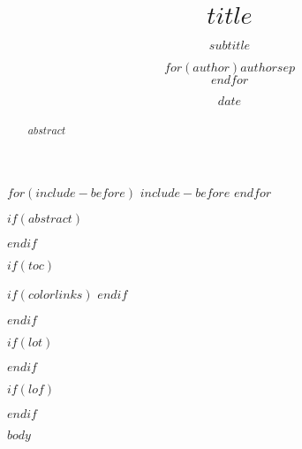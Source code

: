 \documentclass[doctor,twoside,chapterhead,otf]{znufethesis}
\title{$title$}
\title{}
\subtitle{$subtitle$}
\author{$for(author)$$author$$sep$ \\ $endfor$}
\author{}
\date{$date$}
\date{}
\begin{document}

\blankpage

$for(include-before)$
$include-before$
$endfor$

\cleardoublepage
{} %

\blankpage

\cleardoublepage
\frontmatter
\pagestyle{plain}

\cleardoublepage
{} %
\ifodd\thepage
\blankpage
\fi

\cleardoublepage
\frontmatter

\ifodd\therealpage
\blankpage
\fi

$if(abstract)$
\begin{abstract}
$abstract$
\end{abstract}
$endif$

$if(toc)$
{
$if(colorlinks)$
\hypersetup{linkcolor=$if(toccolor)$$toccolor$$else$black$endif$}
$endif$

\setcounter{tocdepth}{$toc-depth$}
\cleardoublepage
{} %
\tableofcontents        %

\ifodd\thepage
\blankpage
\fi
}
$endif$

$if(lot)$
\cleardoublepage
{} %
\listoftables           %

\ifodd\thepage
\blankpage
\fi
$endif$

$if(lof)$
\cleardoublepage
{} %
\listoffigures          %

\ifodd\thepage
\blankpage
\fi
$endif$

\mainmatter
\pagestyle{mpage}

$body$

\ifodd\thepage
\blankpage
\fi
\end{document}
